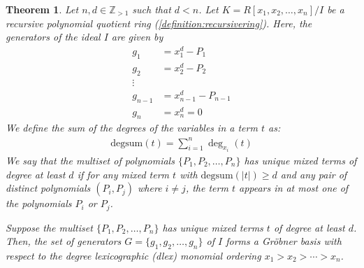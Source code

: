 \documentclass[12pt,reqno]{article}
\theoremstyle{plain}
\newtheorem{theorem}{Theorem}
\newcommand{\degsum}{\mathrm{degsum}}
\begin{document}
\begin{theorem} \label{proof:grobnerbasis}
Let $n,d \in \mathbb{Z}_{>1}$ such that $d < n$. Let $K = R[x_1, x_2, \ldots, x_n]/I$ be a recursive polynomial quotient ring (\cref{definition:recursivering}). Here, the generators of the ideal $I$ are given by
\begin{align*}
    g_1 &= x_1^d - P_1 \\
    g_2 &= x_2^d - P_2 \\
    \vdots & \\
    g_{n-1} &= x_{n-1}^d - P_{n-1} \\
    g_n &= x_n^d = 0
\end{align*}
We define the sum of the degrees of the variables in a term $t$ as:
\begin{align*}
    \mathrm{degsum}(t) = \sum_{i=1}^n \deg_{x_i}(t)
\end{align*}
We say that the multiset of polynomials $\{ P_1, P_2, \ldots, P_n \}$ has unique mixed terms of degree at least $d$ if for any mixed term $t$ with $\degsum(|t|) \geq d$ and any pair of distinct polynomials $(P_i,P_j)$ where $i \neq j$, the term $t$ appears in at most one of the polynomials $P_i$ or $P_j$.

Suppose the multiset $\{ P_1, P_2, \ldots, P_n \}$ has unique mixed terms $t$ of degree at least $d$. Then, the set of generators $G = \{ g_1, g_2, \ldots, g_n \}$ of $I$ forms a Gröbner basis with respect to the degree lexicographic (dlex) monomial ordering $x_1 > x_2 > \cdots > x_n$.
\end{theorem}
\end{document}
